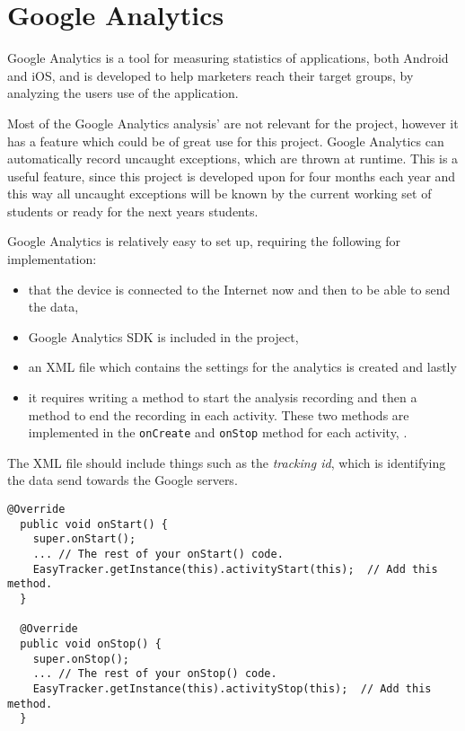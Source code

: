 \section{Google Analytics}

Google Analytics is a tool for measuring statistics of applications, both Android and iOS, and is developed to help marketers reach their target groups, by analyzing the users use of the application.

Most of the Google Analytics analysis' are not relevant for the \giraf project, however it has a feature which could be of great use for this project.
Google Analytics can automatically record uncaught exceptions, which are thrown at runtime.
This is a useful feature, since this project is developed upon for four months each year and this way all uncaught exceptions will be known by the current working set of students or ready for the next years students.

Google Analytics is relatively easy to set up, requiring the following for implementation:
\begin{itemize}
\item that the device is connected to the Internet now and then to be able to send the data,
\item Google Analytics SDK is included in the project,
\item an XML file which contains the settings for the analytics is created and lastly
\item it requires writing a method to start the analysis recording and then a method to end the recording in each activity. These two methods are implemented in the \texttt{onCreate} and \texttt{onStop} method for each activity, .
\end{itemize}
The XML file should include things such as the \textit{tracking id}, which is identifying the data send towards the Google servers.

\begin{lstlisting}[caption=Illustration of the code that needs to be added to \lstinline{OnCreate} and \lstinline{OnStop} methods, label=list:googleanalystics]
  @Override
  public void onStart() {
    super.onStart();
    ... // The rest of your onStart() code.
    EasyTracker.getInstance(this).activityStart(this);  // Add this method.
  }

  @Override
  public void onStop() {
    super.onStop();
    ... // The rest of your onStop() code.
    EasyTracker.getInstance(this).activityStop(this);  // Add this method.
  }
\end{lstlisting}

